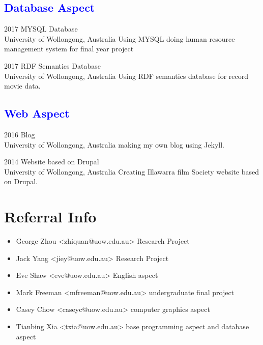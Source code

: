 \documentclass[]{friggeri-cv}
\begin{document}
\subsection*{\textcolor{blue}{Database Aspect}}

\begin{entrylist}
  \entry
    {2017}
    {MYSQL Database\\}
    {University of Wollongong, Australia}
    {Using MYSQL doing human resource management system for final year project}
\end{entrylist}

\begin{entrylist}
  \entry
    {2017}
    {RDF Semantics Database\\}
    {University of Wollongong, Australia}
    {Using RDF semantics database for record movie data.}
\end{entrylist}

\subsection*{\textcolor{blue}{Web Aspect}}

\begin{entrylist}
  \entry
    {2016}
    {Blog\\}
    {University of Wollongong, Australia}
    {making my own blog using Jekyll.}
\end{entrylist}

\begin{entrylist}
  \entry
    {2014}
    {Website based on Drupal\\}
    {University of Wollongong, Australia}
    {Creating Illawarra film Society website based on Drupal.}
\end{entrylist}

\section{Referral Info}
\begin{itemize}
	\item George Zhou <zhiquan@uow.edu.au> Research Project
	
	\item Jack Yang <jiey@uow.edu.au> Research Project
	
	\item Eve Shaw <eve@uow.edu.au> English aspect
	
	\item Mark Freeman <mfreeman@uow.edu.au> undergraduate final project
	
	\item Casey Chow <caseyc@uow.edu.au> computer graphics aspect
	
	\item Tianbing Xia <txia@uow.edu.au> base programming aspect and database aspect
\end{itemize}
\end{document}
